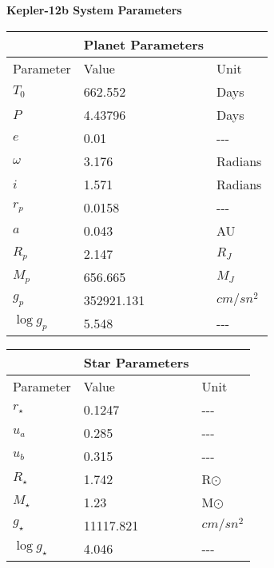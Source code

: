 \documentclass{article}%
\begin{document}
%
\normalsize%
\begin{minipage}{\textwidth}%
\centering%
\begin{Large}%
\textbf{Kepler{-}12b System Parameters}%
\end{Large}%
\end{minipage}%
\renewcommand{\arraystretch}{2}%
\setlength{\tabcolsep}{40px}%
\begin{longtable}[c]{l l l}%
\hline%
 &Planet Parameters& \\%
\hline%
\hline%
Parameter&Value&Unit\\%
\hline%
$T_{0}$&662.552&Days\\%
$P$&4.43796&Days\\%
$e$&0.01&{-}{-}{-}\\%
$\omega$&3.176&Radians\\%
$i$&1.571&Radians\\%
$r_{p}$&0.0158&{-}{-}{-}\\%
$a$&0.043&AU\\%
$R_{p}$&2.147&$R_{J}$\\%
$M_{p}$&656.665&$M_{J}$\\%
$g_{p}$&352921.131&$cm/sn^2$\\%
$\log g_{p}$&5.548&{-}{-}{-}\\%
\hline%
\end{longtable}%
\renewcommand{\arraystretch}{2}%
\setlength{\tabcolsep}{40px}%
\begin{longtable}[c]{l l l}%
\hline%
 &Star Parameters& \\%
\hline%
\hline%
Parameter&Value&Unit\\%
\hline%
$r_{\star}$&0.1247&{-}{-}{-}\\%
$u_{a}$&0.285&{-}{-}{-}\\%
$u_{b}$&0.315&{-}{-}{-}\\%
$R_{\star}$&1.742&R{\(\odot\)}\\%
$M_{\star}$&1.23&M{\(\odot\)}\\%
$g_{\star}$&11117.821&$cm/sn^2$\\%
$\log g_{\star}$&4.046&{-}{-}{-}\\%
\hline%
\hline%
\end{longtable}%
\end{document}
